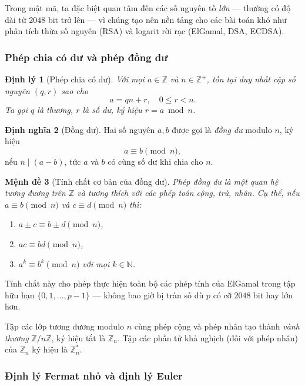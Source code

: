 \documentclass[12pt,a4paper]{report}
\newtheorem{theorem}{Định lý}[chapter]
\newtheorem{proposition}[theorem]{Mệnh đề}
\theoremstyle{definition}
\newtheorem{definition}[theorem]{Định nghĩa}
\theoremstyle{remark}
\begin{document}
Trong mật mã, ta đặc biệt quan tâm đến các số nguyên tố \emph{lớn} — thường có độ dài từ $2048$ bit trở lên — vì chúng tạo nên nền tảng cho các bài toán khó như phân tích thừa số nguyên (RSA) và logarit rời rạc (ElGamal, DSA, ECDSA).

\subsubsection{Phép chia có dư và phép đồng dư}

\begin{theorem}[Phép chia có dư]
Với mọi $a \in \mathbb{Z}$ và $n \in \mathbb{Z}^+$, tồn tại duy nhất cặp số nguyên $(q, r)$ sao cho
\[
a = qn + r, \quad 0 \leq r < n.
\]
Ta gọi $q$ là \emph{thương}, $r$ là \emph{số dư}, ký hiệu $r = a \bmod n$.
\end{theorem}

\begin{definition}[Đồng dư]
Hai số nguyên $a, b$ được gọi là \emph{đồng dư} modulo $n$, ký hiệu
\[
a \equiv b \pmod{n},
\]
nếu $n \mid (a - b)$, tức $a$ và $b$ có cùng số dư khi chia cho $n$.
\end{definition}

\begin{proposition}[Tính chất cơ bản của đồng dư]
Phép đồng dư là một quan hệ tương đương trên $\mathbb{Z}$ và tương thích với các phép toán cộng, trừ, nhân. Cụ thể, nếu $a \equiv b \pmod{n}$ và $c \equiv d \pmod{n}$ thì:
\begin{enumerate}
    \item $a \pm c \equiv b \pm d \pmod{n}$,
    \item $ac \equiv bd \pmod{n}$,
    \item $a^k \equiv b^k \pmod{n}$ với mọi $k \in \mathbb{N}$.
\end{enumerate}
\end{proposition}

Tính chất này cho phép thực hiện toàn bộ các phép tính của ElGamal trong tập hữu hạn $\{0, 1, \ldots, p-1\}$ — không bao giờ bị tràn số dù $p$ có cỡ $2048$ bit hay lớn hơn.

Tập các lớp tương đương modulo $n$ cùng phép cộng và phép nhân tạo thành \emph{vành thương} $\mathbb{Z}/n\mathbb{Z}$, ký hiệu tắt là $\mathbb{Z}_n$. Tập các phần tử khả nghịch (đối với phép nhân) của $\mathbb{Z}_n$ ký hiệu là $\mathbb{Z}_n^*$.

\subsubsection{Định lý Fermat nhỏ và định lý Euler}
\end{document}

